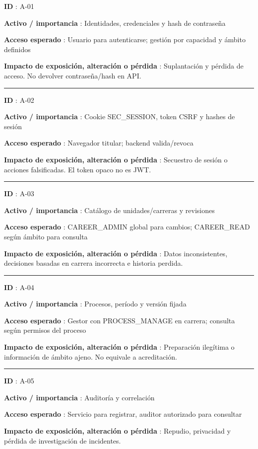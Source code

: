 \documentclass[12pt,a4paper]{report}
\begin{document}
\textbf{ID }: A-01

\textbf{Activo / importancia }: Identidades, credenciales y hash de
contraseña

\textbf{Acceso esperado }: Usuario para autenticarse; gestión por
capacidad y ámbito definidos

\textbf{Impacto de exposición, alteración o pérdida }: Suplantación y
pérdida de acceso. No devolver contraseña/hash en API.

\medskip\hrule\medskip

\textbf{ID }: A-02

\textbf{Activo / importancia }: Cookie SEC\_SESSION, token CSRF y hashes
de sesión

\textbf{Acceso esperado }: Navegador titular; backend valida/revoca

\textbf{Impacto de exposición, alteración o pérdida }: Secuestro de
sesión o acciones falsificadas. El token opaco no es JWT.

\medskip\hrule\medskip

\textbf{ID }: A-03

\textbf{Activo / importancia }: Catálogo de unidades/carreras y
revisiones

\textbf{Acceso esperado }: CAREER\_ADMIN global para cambios;
CAREER\_READ según ámbito para consulta

\textbf{Impacto de exposición, alteración o pérdida }: Datos
inconsistentes, decisiones basadas en carrera incorrecta e historia
perdida.

\medskip\hrule\medskip

\textbf{ID }: A-04

\textbf{Activo / importancia }: Procesos, período y versión fijada

\textbf{Acceso esperado }: Gestor con PROCESS\_MANAGE en carrera;
consulta según permisos del proceso

\textbf{Impacto de exposición, alteración o pérdida }: Preparación
ilegítima o información de ámbito ajeno. No equivale a acreditación.

\medskip\hrule\medskip

\textbf{ID }: A-05

\textbf{Activo / importancia }: Auditoría y correlación

\textbf{Acceso esperado }: Servicio para registrar, auditor autorizado
para consultar

\textbf{Impacto de exposición, alteración o pérdida }: Repudio,
privacidad y pérdida de investigación de incidentes.
\end{document}
